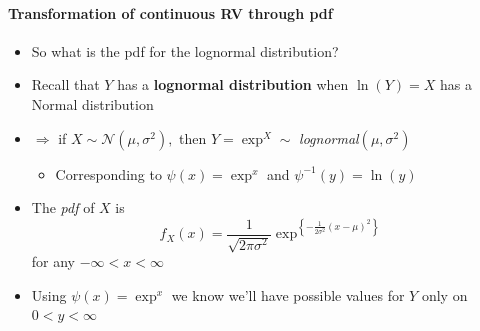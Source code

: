 \documentclass[notes=show,smaller,handout]{beamer}\usepackage[]{graphicx}\usepackage[]{color}
\newcommand{\N}{\mathcal{N}}
\newenvironment{stepitemize}{\begin{itemize}[<+->]}{\end{itemize} }
\begin{document}
\begin{frame}{\secname}
  \framesubtitle{Transformation of continuous RV through pdf }

  \begin{example}
  \begin{stepitemize}
  \item So what is the pdf for the lognormal distribution?

  \item Recall that $Y$ has a \textbf{lognormal distribution} when $\ln \left(
  Y\right) =X$ has a Normal distribution

  \item $\Rightarrow $ if $X\sim \N\left( \mu ,\sigma ^{2}\right) ,$ then $%
  Y=\exp^X\sim $ \emph{lognormal}$\left( \mu ,\sigma ^{2}\right) $

  \begin{stepitemize}
  \item Corresponding to $\psi \left( x\right) =\exp^x$ and $\psi
  ^{-1}\left( y\right) =\ln (y)$
  \end{stepitemize}

  \item The \emph{pdf} of $X$ is
  \begin{equation*}
  f_{X}\left( x\right) =\frac{1}{\sqrt{2\pi \sigma ^{2}}}\exp^{ \left\{ -\frac{1%
  }{2\sigma ^{2}}\left( x-\mu \right) ^{2}\right\}}
  \end{equation*}%
  for any $-\infty <x<\infty $

  \item Using $\psi \left( x\right) =\exp^x$ we know we'll have possible
  values for $Y$ only on $0<y<\infty $
  \end{stepitemize}
  \end{example}
\end{frame}
\end{document}
